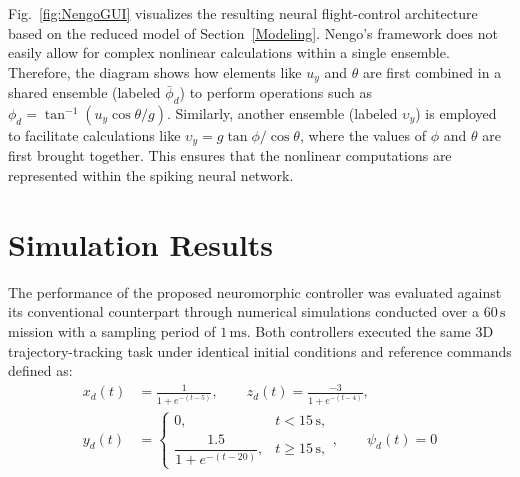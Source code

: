 \documentclass[conference]{IEEEtran}
\begin{document}

Fig.~\ref{fig:NengoGUI} visualizes the resulting neural flight-control architecture based on the reduced model of Section~\ref{Modeling}. Nengo's framework does not easily allow for complex nonlinear calculations within a single ensemble. Therefore, the diagram shows how elements like $u_y$ and $\theta$ are first combined in a shared ensemble (labeled $\bar{\phi}_d$) to perform operations such as $\phi_d = \tan^{-1}(u_y \cos\theta / g)$. Similarly, another ensemble (labeled $\upsilon_y$) is employed to facilitate calculations like $\upsilon_y = g \tan\phi / \cos\theta$, where the values of $\phi$ and $\theta$ are first brought together. This ensures that the nonlinear computations are represented within the spiking neural network.



\section{Simulation Results}\label{Simulations}
%
The performance of the proposed neuromorphic controller was evaluated against its conventional counterpart through numerical simulations conducted over a $60\,\mathrm{s}$ mission with a sampling period of $1\,\mathrm{ms}$. Both controllers executed the same 3D trajectory-tracking task under identical initial conditions and reference commands defined as:
%
\begin{equation}
\label{eq:mission}
\begin{aligned}
x_d(t) &= \frac{1}{1+e^{-(t-5)}}, \qquad
z_d(t) = \frac{-3}{1+e^{-(t-4)}},\\[2pt]
y_d(t) &=
\begin{cases}
0, & t < 15\,\mathrm{s},\\[2pt]
\dfrac{1.5}{1+e^{-(t-20)}}, & t \ge 15\,\mathrm{s},
\end{cases}, \qquad
\psi_d(t) = 0
\\[2pt]
\\[2pt]
\end{aligned}
\end{equation}
\end{document}
